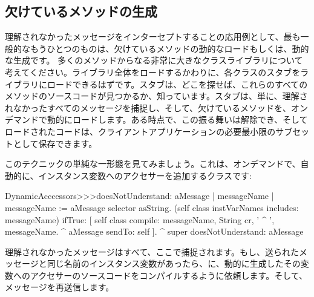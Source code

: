 \documentclass[a4paper,10pt,twoside]{book}
\begin{document}
\subsection{欠けているメソッドの生成}

理解されなかったメッセージをインターセプトすることの応用例として、最も一般的なもうひとつのものは、欠けているメソッドの動的なロードもしくは、動的な生成です。
多くのメソッドからなる非常に大きなクラスライブラリについて考えてください。ライブラリ全体をロードするかわりに、各クラスのスタブをライブラリにロードできるはずです。スタブは、どこを探せば、これらのすべてのメソッドのソースコードが見つかるか、知っています。スタブは、単に、理解されなかったすべてのメッセージを捕捉し、そして、欠けているメソッドを、オンデマンドで動的にロードします。ある時点で、この振る舞いは解除でき、そしてロードされたコードは、クライアントアプリケーションの必要最小限のサブセットとして保存できます。


このテクニックの単純な一形態を見てみましょう。これは、オンデマンドで、自動的に、インスタンス変数へのアクセサーを追加するクラスです:

\begin{code}{}
DynamicAcccessors>>>doesNotUnderstand: aMessage
	| messageName |
	messageName := aMessage selector asString.
	(self class instVarNames includes: messageName)
		ifTrue: [
			self class compile: messageName, String cr, ' ^ ', messageName.
			^ aMessage sendTo: self ].
	^ super doesNotUnderstand: aMessage
\end{code}
理解されなかったメッセージはすべて、ここで捕捉されます。もし、送られたメッセージと同じ名前のインスタンス変数があったら、に、動的に生成したその変数へのアクセサーのソースコードをコンパイルするように依頼します。そして、メッセージを再送信します。
\end{document}
